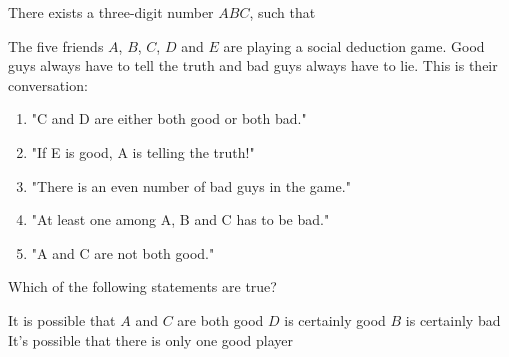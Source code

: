 \documentclass{article}
\begin{document}
\begin{problem}
There exists a three-digit number $ABC$, such that
\begin{tasks2}
\end{tasks2}
\end{problem}

\begin{problem}
The five friends $A$, $B$, $C$, $D$ and $E$ are playing a social deduction game. Good guys always have to tell the truth and bad guys always have to lie. This is their conversation:
\begin{enumerate}[label=\Alph*:]
\item "C and D are either both good or both bad." 
\item "If E is good, A is telling the truth!"
\item "There is an even number of bad guys in the game."
\item "At least one among A, B and C has to be bad."
\item "A and C are not both good."
\end{enumerate}
Which of the following statements are true?
\end{problem}
\begin{tasks2}
\task It is possible that $A$ and $C$ are both good
\task $D$ is certainly good
\task $B$ is certainly bad
\task It's possible that there is only one good player
\end{tasks2}
\end{document}
